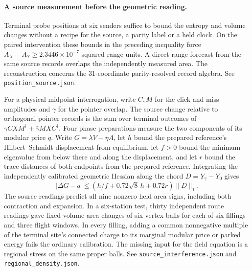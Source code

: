 \documentclass[11pt]{article}
\begin{document}
\paragraph{A source measurement before the geometric reading.}
Terminal probe positions at six senders suffice to bound the entropy
and volume changes without a recipe for the source, a parity label or a
held clock. On the paired intervention these bounds in the preceding
inequality force \(A_X-A_Y\ge 2.3446\times10^{-7}\) squared range
units. A direct range forecast from the same source records overlaps
the independently measured area. The reconstruction concerns the
31-coordinate parity-resolved record algebra. See
\texttt{position\_source.json}.

For a physical midpoint interrogation, write \(C,M\) for the click
and miss amplitudes and \(\gamma\) for the pointer overlap. The source
change relative to orthogonal pointer records is the sum over terminal
outcomes of \(\gamma C X M^\dagger+\bar\gamma M X C^\dagger\).
Four phase preparations measure the two components of its modular
price \(q\). Write \(G=\lambda V-\eta A\), let \(h\) bound the
prepared reference's Hilbert--Schmidt displacement from equilibrium,
let \(f>0\) bound the minimum eigenvalue from below there and along the
displacement, and let \(r\) bound the trace distances of both endpoints
from the prepared reference. Integrating the independently calibrated
geometric Hessian along the chord \(D=Y_\gamma-Y_0\) gives
\[
 |\Delta G-q|\le (h/f+0.72\sqrt{8}\,h+0.72r)\|D\|_1 .
\]
The source readings predict all nine nonzero held area signs, including
both contraction and expansion. In a six-station test, thirty independent
route readings gave fixed-volume area changes of six vertex balls for
each of six fillings and three flight windows. In every filling, adding
a common nonnegative multiple of the terminal site's connected charge
to its marginal modular price or parked energy fails the ordinary
calibration. The missing input for the field equation is a regional stress
on the same proper balls. See \texttt{source\_interference.json}
and \texttt{regional\_density.json}.
\end{document}
